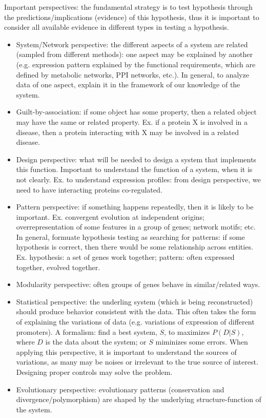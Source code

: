 \documentclass{report}
\begin{document}
Important perspectives: the fundamental strategy is to test hypothesis through the predictions/implications (evidence) of this hypothesis, thus it is important to consider all available evidence in different types in testing a hypothesis. 
\begin{itemize}
	\item System/Network perspective: the different aspects of a system are related (sampled from different methods): one aspect may be explained by another (e.g. expression pattern explained by the functional requirements, which are defined by metabolic networks, PPI networks, etc.). In general, to analyze data of one aspect, explain it in the framework of our knowledge of the system. 
	\item Guilt-by-association: if some object has some property, then a related object may have the same or related property. Ex. if a protein X is involved in a disease, then a protein interacting with X may be involved in a related disease. 
	\item Design perspective: what will be needed to design a system that implements this function. Important to understand the function of a system, when it is not clearly. Ex. to understand expression profiles: from design perspective, we need to have interacting proteins co-regulated. 
	\item Pattern perspective: if something happens repeatedly, then it is likely to be important. Ex. convergent evolution at independent origins; overrepresentation of some features in a group of genes; network motifs; etc. In general, formuate hypothesis testing as searching for patterns: if some hypothesis is correct, then there would be some relationship across entities. Ex. hypothesis: a set of genes work together; pattern: often expressed together, evolved together. 
	\item Modularity perspective: often groups of genes behave in similar/related ways.
	\item Statistical perspective: the underling system (which is being reconstructed) should produce behavior consistent with the data. This often takes the form of explaining the variations of data (e.g. variations of expression of different promoters). A formalism: find a best system, $S$, to maximizes $P(D|S)$, where $D$ is the data about the system; or $S$ miminizes some errors. When applying this perspective, it is important to understand the sources of variations, as many may be noises or irrelevant to the true source of interest. Designing proper controls may solve the problem. 
	\item Evolutionary perspective: evolutionary patterns (conservation and divergence/polymorphism) are shaped by the underlying structure-function of the system. 
\end{itemize}
\end{document}
